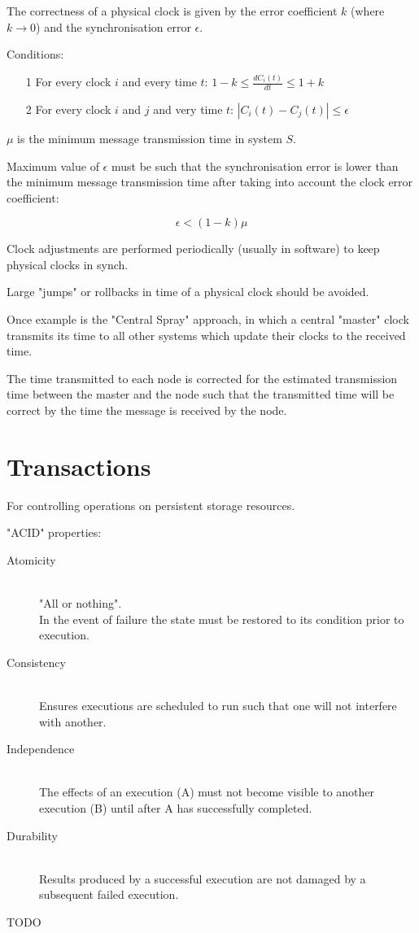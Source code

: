 \documentclass[a4paper]{article}
\begin{document}
The correctness of a physical clock is given by the error coefficient $k$ (where
$k \rightarrow 0$) and the synchronisation error $\epsilon$.

Conditions:

\begin{enumerate}
  \item[1] For every clock $i$ and every time $t$: $1-k \leq
           \frac{dC_{i}(t)}{dt} \leq 1 + k$
  \item[2] For every clock $i$ and $j$ and very time $t$: $|C_{i}(t) - C_{j}(t)|
           \leq \epsilon$
\end{enumerate}

$\mu$ is the minimum message transmission time in system $S$.

Maximum value of $\epsilon$ must be such that the synchronisation error is lower
than the minimum message transmission time after taking into account the clock
error coefficient:

\[
  \epsilon < (1-k)\mu
\]

Clock adjustments are performed periodically (usually in software) to keep
physical clocks in synch.

Large "jumps" or rollbacks in time of a physical clock should be avoided.

Once example is the "Central Spray" approach, in which a central "master" clock
transmits its time to all other systems which update their clocks to the
received time.

The time transmitted to each node is corrected for the estimated transmission
time between the master and the node such that the transmitted time will be
correct by the time the message is received by the node.

\section{Transactions}
\label{sec:transactions}

For controlling operations on persistent storage resources.

"ACID" properties:

\begin{description}
  \item[Atomicity] \hfill \\
    "All or nothing". \\
    In the event of failure the state must be restored to its condition prior to
    execution.
  \item[Consistency] \hfill \\
    Ensures executions are scheduled to run such that one will not interfere
    with another.
  \item[Independence] \hfill \\
    The effects of an execution (A) must not become visible to another execution
    (B) until after A has successfully completed.
  \item[Durability] \hfill \\
    Results produced by a successful execution are not damaged by a subsequent
    failed execution.
\end{description}

TODO
\end{document}
